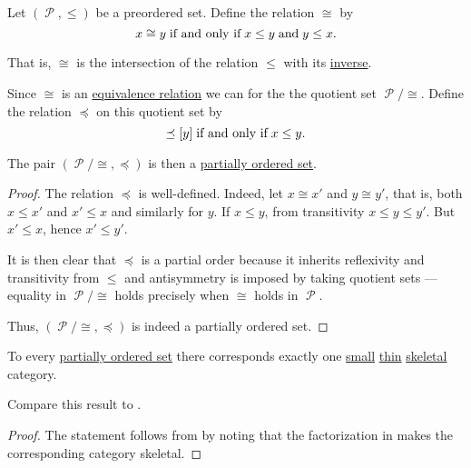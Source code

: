\begin{proposition}\label{thm:preorder_to_partial_order}
  Let \( (\mscrP, \leq) \) be a preordered set. Define the relation \( \cong \) by
  \begin{equation}\label{eq:thm:preorder_to_partial_order/equivalence}
    x \cong y \T{if and only if} x \leq y \T{and} y \leq x.
  \end{equation}

  That is, \( \cong \) is the intersection of the relation \( \leq \) with its \hyperref[def:binary_relation/converse]{inverse}.

  Since \( \cong \) is an \hyperref[def:equivalence_relation]{equivalence relation} we can for the the quotient set \( \mscrP / \cong \). Define the relation \( \preceq \) on this quotient set by
  \begin{equation*}
    [x] \preceq [y] \T{if and only if} x \leq y.
  \end{equation*}

  The pair \( (\mscrP / \cong, \preceq) \) is then a \hyperref[def:partially_ordered_set]{partially ordered set}.
\end{proposition}
\begin{proof}
  The relation \( \preceq \) is well-defined. Indeed, let \( x \cong x' \) and \( y \cong y' \), that is, both \( x \leq x' \) and \( x' \leq x \) and similarly for \( y \). If \( x \leq y \), from transitivity \( x \leq y \leq y' \). But \( x' \leq x \), hence \( x' \leq y' \).

  It is then clear that \( \preceq \) is a partial order because it inherits reflexivity and transitivity from \( \leq \) and antisymmetry is imposed by taking quotient sets --- equality in \( \mscrP / \cong \) holds precisely when \( \cong \) holds in \( \mscrP \).

  Thus, \( (\mscrP / \cong, \preceq) \) is indeed a partially ordered set.
\end{proof}

\begin{proposition}\label{thm:partial_order_category_correspondence}
  To every \hyperref[def:partially_ordered_set]{partially ordered set} there corresponds exactly one \hyperref[def:small_and_large_categories]{small} \hyperref[def:thin_category]{thin} \hyperref[def:skeletal_category]{skeletal} category.

  Compare this result to .
\end{proposition}
\begin{proof}
  The statement follows from  by noting that the factorization in  makes the corresponding category skeletal.
\end{proof}

